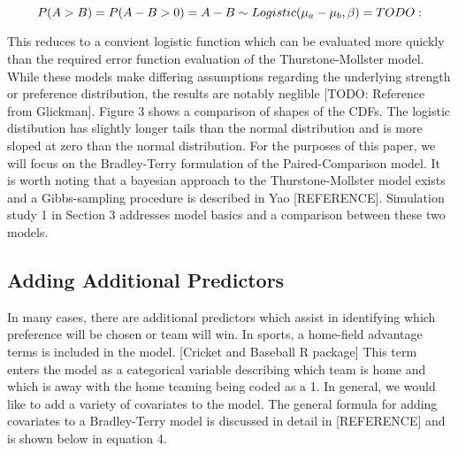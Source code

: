 \documentclass{article}
\begin{document}
\[ P(A > B) = P(A - B > 0)\\
            = A - B \sim Logistic(\mu_a - \mu_b, \beta)
            = TODO: \]
            

This reduces to a convient logistic function which can be evaluated more quickly than the required error function evaluation of the Thurstone-Mollster model. While these models make differing assumptions regarding the underlying strength or preference distribution, the results are notably neglible [TODO: Reference from Glickman]. Figure 3 shows a comparison of shapes of the CDFs. The logistic distibution has slightly longer tails than the normal distribution and is more sloped at zero than the normal distribution. For the purposes of this paper, we will focus on the Bradley-Terry formulation of the Paired-Comparison model. It is worth noting that a bayesian approach to the Thurstone-Mollster model exists and a Gibbs-sampling procedure is described in Yao [REFERENCE]. Simulation study 1 in Section 3 addresses model basics and a comparison between these two models.


\subsection{Adding Additional Predictors}

In many cases, there are additional predictors which assist in identifying which preference will be chosen or team will win. In sports, a home-field advantage terms is included in the model. [Cricket and Baseball R package] This term enters the model as a categorical variable describing which team is home and which is away with the home teaming being coded as a 1. In general, we would like to add a variety of covariates to the model. The general formula for adding covariates to a Bradley-Terry model is discussed in detail in [REFERENCE] and is shown below in equation 4.

\end{document}
